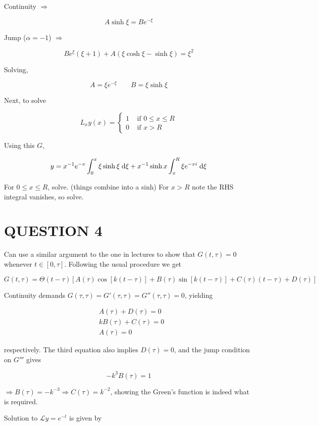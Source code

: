 \documentclass[a4paper]{article}
\begin{document}
Continuity $ \Rightarrow $

\[ A \sinh \xi  = B e^{-\xi}   \]

Jump ($ \alpha =-1 $) $  \Rightarrow $ 

\[ Be^{\xi}(\xi + 1) + A( \xi \cosh \xi - \sinh \xi) = \xi^{2}  \]

Solving,

\[ A = \xi e^{-\xi} \qquad B = \xi \sinh \xi  \]


Next, to solve 

\[ L_{x}y(x) = \begin{cases} 1  & \text{ if } 0 \leq x \leq R \\ 0 & \text{ if } x > R  \end{cases} \]

Using this $ G $,

\[ y = x^{-1}e^{-x} \int_{0}^{x} \xi \sinh \xi \; \mathrm{d} \xi + x^{-1} \sinh x \int_{x}^{R} \xi e^{-xi} \; \mathrm{d} \xi  \]

For $ 0 \leq x \leq R $, solve. (things combine into a sinh) For $ x > R $ note the RHS integral vanishes, so solve. 



\section{QUESTION 4}

Can use a similar argument to the one in lectures to show that $ G(t,\tau) = 0 $ whenever $ t \in [0,\tau] $.
Following the usual procedure we get

\[ G(t,\tau)  =  \Theta ( t - \tau)[A(\tau) \cos[k(t - \tau)] + B(\tau)\sin[k(t - \tau)] + C(\tau) (t - \tau) + D(\tau)   ]  \]

Continuity demands $ G(\tau,\tau) = G'(\tau,\tau) = G''(\tau,\tau) = 0 $, yielding

\begin{align*}
& A(\tau) + D(\tau) = 0 \\
& kB(\tau) + C(\tau) = 0\\
& A(\tau) = 0 
\end{align*}

respectively. The third equation also implies $ D(\tau) = 0 $, and the jump condition on $ G''' $ gives

\[  - k^{3} B(\tau) = 1  \]

$ \Rightarrow  B(\tau) = -k^{-3} \Rightarrow C(\tau) = k^{-2}  $, showing the Green's function is indeed what is required. 

Solution to $ \mathcal{L}y = e^{-t} $ is given by
\end{document}
